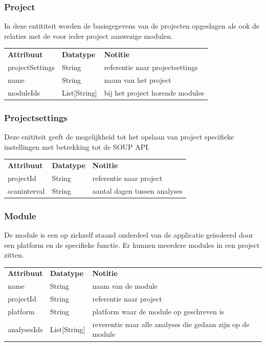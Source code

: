 \subsubsection{Project}\label{subsubsec:project}
In deze entititeit worden de basisgegevens van de projecten opgeslagen als ook de relaties met de voor ieder project aanwezige modulen.

\begin{tabular}{lll}
    \textbf{Attribuut} & \textbf{Datatype} & \textbf{Notitie}                \\
    projectSettings    & String            & referentie naar projectsettings \\
    name               & String            & naam van het project            \\
    moduleIds          & List[String]      & bij het project horende modules \\

\end{tabular}

\subsubsection{Projectsettings}\label{subsubsec:projectsettings}
Deze enititeit geeft de mogelijkheid tot het opslaan van project specifieke instellingen met betrekking tot de SOUP API.

\begin{tabular}{lll}
    \textbf{Attribuut} & \textbf{Datatype} & \textbf{Notitie}             \\
    projectId          & String            & referentie naar project      \\
    scaninterval       & String            & aantal dagen tussen analyses \\
\end{tabular}

\subsubsection{Module}\label{subsubsec:module}
De module is een op zichzelf staand onderdeel van de applicatie geïsoleerd door een platform en de specifieke functie. Er kunnen meerdere modules in een project zitten.

\begin{tabular}{lll}
    \textbf{Attribuut} & \textbf{Datatype} & \textbf{Notitie}                                           \\
    name               & String            & naam van de module                                         \\
    projectId          & String            & referentie naar project                                    \\
    platform           & String            & platform waar de module op geschreven is                   \\
    analysesIds        & List[String]      & reverentie naar alle analyses die gedaan zijn op de module \\
\end{tabular}


